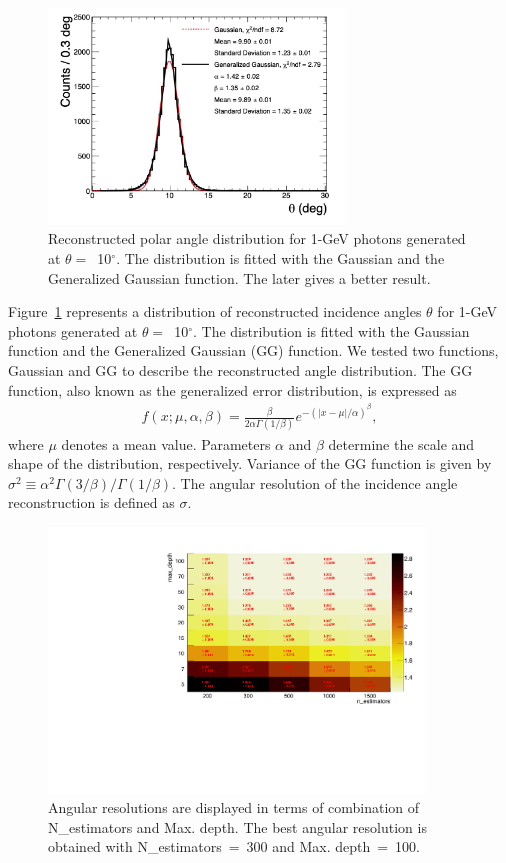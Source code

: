 \documentclass[preprint,12pt,times,a4paper]{elsarticle}
\begin{document}
\begin{figure}[!hbt]
\includegraphics[width=0.7\textwidth]{figures/GG_fit.jpg}
\caption{ Reconstructed polar angle distribution for 1-GeV photons generated at $\theta=$~10$^{\circ}$. The distribution is fitted with the Gaussian and the Generalized Gaussian function. The later gives a better result.}
\label{fig:angle_10degree}
\end{figure}

Figure~\ref{fig:angle_10degree} represents a distribution of reconstructed incidence angles $\theta$ for 1-GeV photons generated at $\theta=$~10$^{\circ}$. The distribution is fitted with the Gaussian function and the Generalized Gaussian (GG) function. We tested two functions, Gaussian and GG to describe the reconstructed angle distribution. The GG function, also known as the generalized error distribution, is expressed as
\begin{eqnarray} 
f(x; \mu, \alpha, \beta) = \frac{\beta}{2 \alpha \Gamma(1/\beta)}e^{-(|x-\mu|/\alpha)^\beta},
\label{eqn:gg}
\end{eqnarray}
where $\mu$ denotes a mean value. Parameters $\alpha$ and $\beta$ determine the scale and shape of the distribution, respectively. Variance of the GG function is given by $\sigma^2 \equiv \alpha^2 \Gamma(3/\beta) / \Gamma(1/\beta)$. The angular resolution of the incidence angle reconstruction is defined as $\sigma$.

\begin{figure}[!hbt]
\includegraphics[width=0.89\textwidth]{figures/optimization_plot.pdf}
\caption{Angular resolutions are displayed in terms of combination of N\_estimators and Max. depth. The best angular resolution is obtained with N\_estimators~=~300 and Max. depth~=~100. }
\label{fig:par_scan}
\end{figure}
\end{document}
